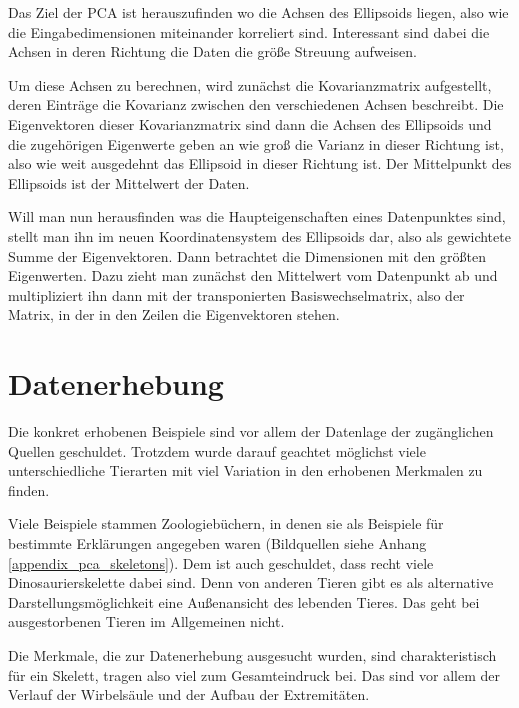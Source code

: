  Das Ziel der PCA ist herauszufinden wo die Achsen des Ellipsoids liegen, also wie die Eingabedimensionen miteinander korreliert sind. Interessant sind dabei die Achsen in deren Richtung die Daten die größe Streuung aufweisen.
 
 Um diese Achsen zu berechnen, wird zunächst die Kovarianzmatrix aufgestellt, deren Einträge die Kovarianz zwischen den verschiedenen Achsen beschreibt.
 Die Eigenvektoren dieser Kovarianzmatrix sind dann die Achsen des Ellipsoids und die zugehörigen Eigenwerte geben an wie groß die Varianz in dieser Richtung ist, also wie weit ausgedehnt das Ellipsoid in dieser Richtung ist. Der Mittelpunkt des Ellipsoids ist der Mittelwert der Daten.
 
 Will man nun herausfinden was die Haupteigenschaften eines Datenpunktes sind, stellt man ihn im neuen Koordinatensystem des Ellipsoids dar, also als gewichtete Summe der Eigenvektoren. Dann betrachtet die Dimensionen mit den größten Eigenwerten. Dazu zieht man zunächst den Mittelwert vom Datenpunkt ab und multipliziert ihn dann mit der transponierten Basiswechselmatrix, also der Matrix, in der in den Zeilen die Eigenvektoren stehen.


 \section{Datenerhebung}
 
 Die konkret erhobenen Beispiele sind vor allem der Datenlage \bzw der zugänglichen Quellen geschuldet. Trotzdem wurde darauf geachtet möglichst viele unterschiedliche Tierarten mit viel Variation in den erhobenen Merkmalen zu finden.
 
 Viele Beispiele stammen Zoologiebüchern, in denen sie als Beispiele für bestimmte Erklärungen angegeben waren (Bildquellen siehe Anhang \ref{appendix_pca_skeletons}). Dem ist auch geschuldet, dass recht viele Dinosaurierskelette dabei sind. Denn von anderen Tieren gibt es als alternative Darstellungsmöglichkeit eine Außenansicht des lebenden Tieres. Das geht bei ausgestorbenen Tieren im Allgemeinen nicht.
 
 Die Merkmale, die zur Datenerhebung ausgesucht wurden, sind charakteristisch für ein Skelett, tragen also viel zum Gesamteindruck bei. Das sind vor allem der Verlauf der Wirbelsäule und der Aufbau der Extremitäten.

